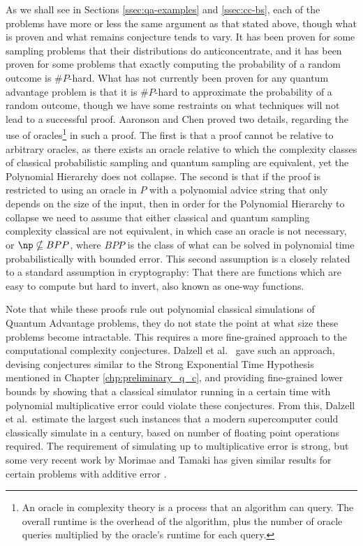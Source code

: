 As we shall see in Sections \ref{ssec:qa-examples} and \ref{ssec:cc-bs}, each of the problems have more or less the same argument as that stated above, though what is proven and what remains conjecture tends to vary. It has been proven for some sampling problems that their distributions do anticoncentrate, and it has been proven for some problems that exactly computing the probability of a random outcome is $\#P$-hard. What has not currently been proven for any quantum advantage problem is that it is $\#P$-hard to approximate the probability of a random outcome, though we have some restraints on what techniques will not lead to a successful proof. Aaronson and Chen \cite{aaronson2016chen} proved two details, regarding the use of oracles\footnote{An oracle in complexity theory is a process that an algorithm can query. The overall runtime is the overhead of the algorithm, plus the number of oracle queries multiplied by the oracle's runtime for each query.} in such a proof. The first is that a proof cannot be relative to arbitrary oracles, as there exists an oracle relative to which the complexity classes of classical probabilistic sampling and quantum sampling are equivalent, yet the Polynomial Hierarchy does not collapse. The second is that if the proof is restricted to using an oracle in $P$ with a polynomial advice string that only depends on the size of the input, then in order for the Polynomial Hierarchy to collapse we need to assume that either classical and quantum sampling complexity classical are not equivalent, in which case an oracle is not necessary, or $\np \nsubseteq BPP$, where $BPP$ is the class of what can be solved in polynomial time probabilistically with bounded error. This second assumption is a closely related to a standard assumption in cryptography: That there are functions which are easy to compute but hard to invert, also known as one-way functions.

Note that while these proofs rule out polynomial classical simulations of Quantum Advantage problems, they do not state the point at what size these problems become intractable. This requires a more fine-grained approach to the computational complexity conjectures. Dalzell et al.~\cite{dalzell2017, dalzell2018} gave such an approach, devising conjectures similar to the Strong Exponential Time Hypothesis mentioned in Chapter \ref{chp:preliminary_q_c}, and providing fine-grained lower bounds by showing that a classical simulator running in a certain time with polynomial multiplicative error could violate these conjectures. From this, Dalzell et al.\ estimate the largest such instances that a modern supercomputer could classically simulate in a century, based on number of floating point operations required. The requirement of simulating up to multiplicative error is strong, but some very recent work by Morimae and Tamaki has given similar results for certain problems with additive error \cite{morimae2019}.


